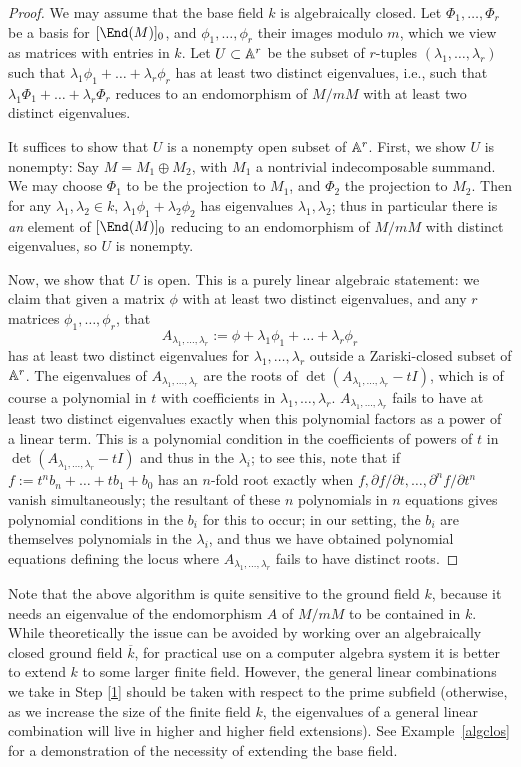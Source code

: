 \documentclass{article}
\let\l\lambda
\let\bar\overline
\numberwithin{equation}{section}
\let\d\partial
\theoremstyle{theorem}
\numberwithin{thm}{section}
\theoremstyle{definition}
\begin{document}
\begin{proof}
  We may assume that the base field $k$ is algebraically closed.
  Let $\Phi_1,\dots,\Phi_r$ be a basis for $[\End(M)]_0$, and $\phi_1,\dots,\phi_r$ their images modulo $m$, which we view as matrices with entries in $k$.
  Let $U\subset \mathbb A^r$ be the subset of $r$-tuples $(\l_1,\dots,\l_r)$ such that $\l_1\phi_1+\dots+\l_r\phi_r$ has at least two distinct eigenvalues, i.e., such that $\l_1\Phi_1+\dots+\l_r\Phi_r$ reduces to an endomorphism of $M/mM$ with at least two distinct eigenvalues.

  It suffices to show that $U$ is a nonempty open subset of $\mathbb A^r$. First, we show $U$ is nonempty:
  Say $M=M_1\oplus M_2$, with $M_1$ a nontrivial indecomposable summand. We may choose $\Phi_1$ to be the projection to $M_1$, and $\Phi_2$ the projection to $M_2$. Then for any $\l_1,\l_2\in k$, $\l_1\phi_1 + \l_2\phi_2$ has eigenvalues $\l_1,\l_2$; thus in particular there is \emph{an} element of $[\End(M)]_0$ reducing to an endomorphism of $M/mM$ with distinct eigenvalues, so $U$ is nonempty.

  Now, we show that $U$ is open. This is a purely linear algebraic statement: we claim that given a matrix $\phi$ with at least two distinct eigenvalues, and any $r$ matrices $\phi_1,\dots,\phi_r$, that
  $$ A_{\l_1,\dots,\l_r}:=\phi+\l_1\phi_1+\dots+\l_r\phi_r $$
  has at least two distinct eigenvalues for $\l_1,\dots,\l_r$ outside a Zariski-closed subset of $\mathbb A^r$.
  The eigenvalues of $A_{\l_1,\dots,\l_r}$ are the roots of $\det(A_{\l_1,\dots,\l_r}-t I)$, which is of course a polynomial in $t$ with coefficients in $\l_1,\dots,\l_r$. $A_{\l_1,\dots,\l_r}$ fails to have at least two distinct eigenvalues exactly when this polynomial factors as a power of a linear term. This is a polynomial condition in the coefficients of powers of $t$ in $\det(A_{\l_1,\dots,\l_r}-t I)$ and thus in the $\l_i$; to see this, note that if
  $ f:=t^n b_n +\dots +t b_1 +b_0 $
  has an $n$-fold root exactly when
  $ f,\d f/\d t,\dots, \d^n f/\d t^n $
  vanish simultaneously; the resultant of these $n$ polynomials in $n$ equations gives polynomial conditions in the $b_i$ for this to occur; in our setting, the $b_i$ are themselves polynomials in the $\l_i$, and thus we have obtained polynomial equations defining the locus where $A_{\l_1,\dots,\l_r}$ fails to have distinct roots.
\end{proof}


\begin{rem}
  Note that the above algorithm is quite sensitive to the ground field $k$, because it needs an eigenvalue of the endomorphism $A$ of $M/mM$ to be contained in $k$. While theoretically the issue can be avoided by working over an algebraically closed ground field $\bar k$, for practical use on a computer algebra system it is better to extend $k$ to some larger finite field. However, the general linear combinations we take in Step \ref{1} should be taken with respect to the prime subfield (otherwise, as we increase the size of the finite field $k$, the eigenvalues of a general linear combination will live in higher and higher field extensions).
See Example~\ref{algclos} for a demonstration of the necessity of extending the base field.
\end{rem}
\end{document}

